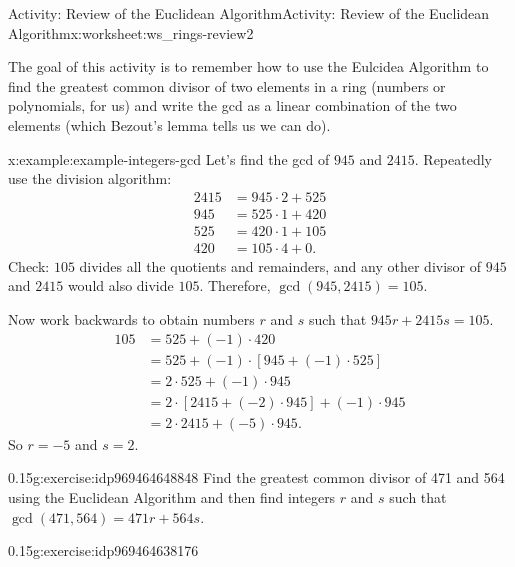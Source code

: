 \documentclass[11pt]{book}
\begin{document}
%
%
\typeout{************************************************}
\typeout{************************************************}
%
\begin{worksheet-subsection}{Activity: Review of the Euclidean Algorithm}{}{Activity: Review of the Euclidean Algorithm}{}{}{x:worksheet:ws_rings-review2}
\begin{introduction}{}%
The goal of this activity is to remember how to use the Eulcidea Algorithm to find the greatest common divisor of two elements in a ring (numbers or polynomials, for us) and write the gcd as a linear combination of the two elements (which Bezout's lemma tells us we can do).%
\begin{example}{}{x:example:example-integers-gcd}%
Let's find the gcd of \(945\) and \(2415\). Repeatedly use the division algorithm:%
\begin{align*}
2415 & = 945 \cdot 2 + 525\\
945 & = 525 \cdot 1 + 420\\
525 & = 420 \cdot 1 + 105\\
420 & = 105 \cdot 4 + 0\text{.}
\end{align*}
Check: \(105\) divides all the quotients and remainders, and any other divisor of \(945\) and \(2415\) would also divide \(105\). Therefore, \(\gcd( 945, 2415 ) = 105\).%
\par
Now work backwards to obtain numbers \(r\) and \(s\) such that \(945 r + 2415 s = 105\).%
\begin{align*}
105 & = 525 + (-1) \cdot 420\\
& = 525 + (-1) \cdot [945 + (-1) \cdot 525]\\
& = 2 \cdot 525 + (-1) \cdot 945\\
& = 2 \cdot [2415 + (-2) \cdot 945] + (-1) \cdot 945\\
& = 2 \cdot 2415 + (-5) \cdot 945\text{.}
\end{align*}
So \(r = -5\) and \(s= 2\).%
\end{example}
\end{introduction}%
\begin{divisionexercise}{1}{}{0.15}{g:exercise:idp969464648848}%
Find the greatest common divisor of 471 and 564 using the Euclidean Algorithm and then find integers \(r\) and \(s\) such that \(\gcd(471,564) = 471r+564s\).%
\end{divisionexercise}%
\begin{divisionexercise}{2}{}{0.15}{g:exercise:idp969464638176}%

\end{divisionexercise}
\end{worksheet-subsection}
\end{document}
